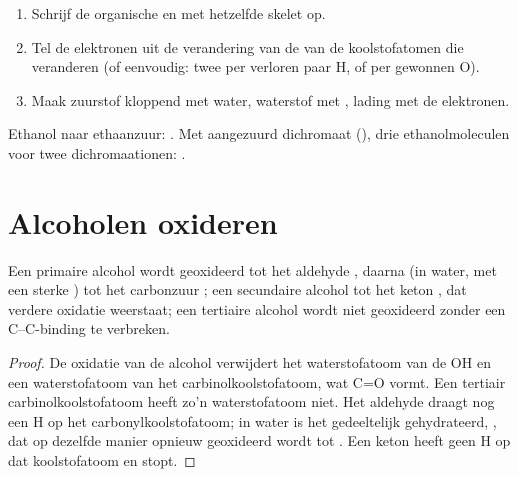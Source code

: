 \begin{method}\label{met:b1:organic-redox:balance-organic-redox}
\begin{enumerate}
  \item Schrijf de organische  en  met hetzelfde skelet
        op.
  \item Tel de elektronen uit de verandering van de  van
        de koolstofatomen die veranderen (of eenvoudig: twee per verloren
        paar H, of per gewonnen O).
  \item Maak zuurstof kloppend met water, waterstof met , lading
        met de elektronen.
\end{enumerate}
Ethanol naar ethaanzuur: .
Met aangezuurd dichromaat (),
drie ethanolmoleculen voor twee dichromaationen:
.
\end{method}

\section{Alcoholen oxideren}

\begin{proposition}\label{prop:b1:organic-redox:alcohol-oxidation}
Een primaire alcohol  wordt geoxideerd tot het aldehyde
, daarna (in water, met een sterke ) tot het carbonzuur
; een secundaire alcohol  tot het keton ,
dat verdere oxidatie weerstaat; een tertiaire alcohol  wordt
niet geoxideerd zonder een C--C-binding te verbreken.
\end{proposition}

\begin{proof}
De oxidatie van de alcohol verwijdert het waterstofatoom van de OH en een
waterstofatoom van het carbinolkoolstofatoom, wat C=O vormt. Een tertiair
carbinolkoolstofatoom heeft zo'n waterstofatoom niet. Het aldehyde draagt
nog een H op het carbonylkoolstofatoom; in water is het gedeeltelijk
gehydrateerd, , dat op dezelfde manier opnieuw geoxideerd
wordt tot . Een keton heeft geen H op dat koolstofatoom en
stopt.
\end{proof}

